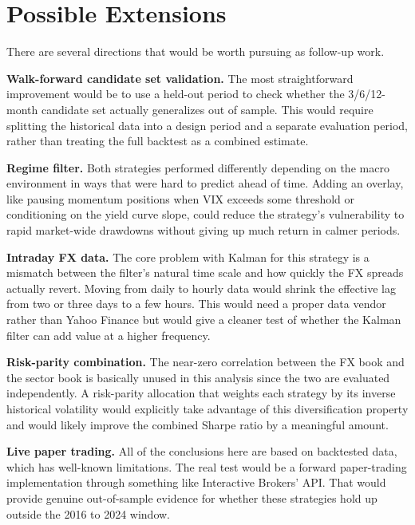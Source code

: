 \documentclass[12pt]{article}
\begin{document}
\section{Possible Extensions}

There are several directions that would be worth pursuing as follow-up work.

\textbf{Walk-forward candidate set validation.} The most straightforward improvement would be to use a held-out period to check whether the 3/6/12-month candidate set actually generalizes out of sample. This would require splitting the historical data into a design period and a separate evaluation period, rather than treating the full backtest as a combined estimate.

\textbf{Regime filter.} Both strategies performed differently depending on the macro environment in ways that were hard to predict ahead of time. Adding an overlay, like pausing momentum positions when VIX exceeds some threshold or conditioning on the yield curve slope, could reduce the strategy's vulnerability to rapid market-wide drawdowns without giving up much return in calmer periods.

\textbf{Intraday FX data.} The core problem with Kalman for this strategy is a mismatch between the filter's natural time scale and how quickly the FX spreads actually revert. Moving from daily to hourly data would shrink the effective lag from two or three days to a few hours. This would need a proper data vendor rather than Yahoo Finance but would give a cleaner test of whether the Kalman filter can add value at a higher frequency.

\textbf{Risk-parity combination.} The near-zero correlation between the FX book and the sector book is basically unused in this analysis since the two are evaluated independently. A risk-parity allocation that weights each strategy by its inverse historical volatility would explicitly take advantage of this diversification property and would likely improve the combined Sharpe ratio by a meaningful amount.

\textbf{Live paper trading.} All of the conclusions here are based on backtested data, which has well-known limitations. The real test would be a forward paper-trading implementation through something like Interactive Brokers' API. That would provide genuine out-of-sample evidence for whether these strategies hold up outside the 2016 to 2024 window.
\end{document}
